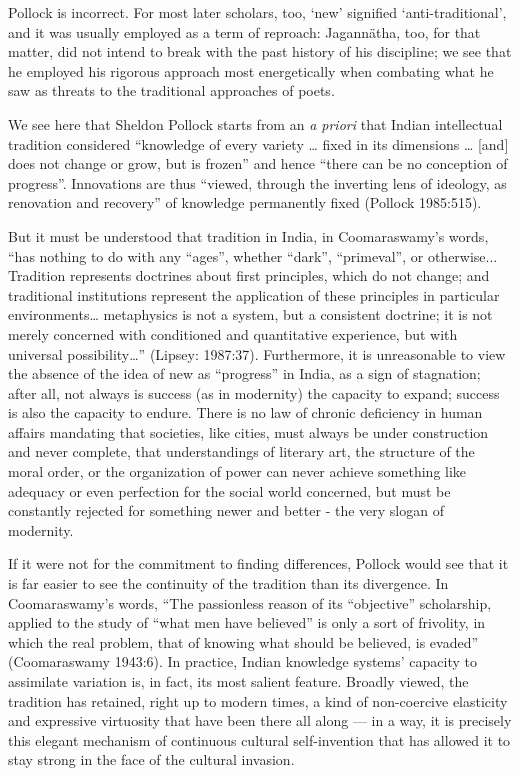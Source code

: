 Pollock is incorrect. For most later scholars, too, ‘new’ signified ‘anti-traditional’, and it was usually employed as a term of reproach: Jagannätha, too, for that matter, did not intend to break with the past history of his discipline; we see that he employed his rigorous approach most energetically when combating what he saw as threats to the traditional approaches of poets.

We see here that Sheldon Pollock starts from an {\sl a priori} that Indian intellectual tradition considered “knowledge of every variety … fixed in its dimensions … [and] does not change or grow, but is frozen” and hence “there can be no conception of progress”. Innovations are thus “viewed, through the inverting lens of ideology, as renovation and recovery” of knowledge permanently fixed (Pollock 1985:515).  

But it must be understood that tradition in India, in Coomaraswamy’s words, “has nothing to do with any “ages”, whether “dark”, “primeval”, or otherwise... Tradition represents doctrines about first principles, which do not change; and traditional institutions represent the application of these principles in particular environments… metaphysics is not a system, but a consistent doctrine; it is not merely concerned with conditioned and quantitative experience, but with universal possibility…” (Lipsey: 1987:37). Furthermore, it is unreasonable to view the absence of the idea of new as “progress” in India, as a sign of stagnation; after all, not always is success (as in modernity) the capacity to expand; success is also the capacity to endure. There is no law of chronic deficiency in human affairs mandating that societies, like cities, must always be under construction and never complete, that understandings of literary art, the structure of the moral order, or the organization of power can never achieve something like adequacy or even perfection for the social world concerned, but must be constantly rejected for something newer and better - the very slogan of modernity.  

If it were not for the commitment to finding differences, Pollock would see that it is far easier to see the continuity of the tradition than its divergence. In Coomaraswamy’s words, “The passionless reason of its “objective” scholarship, applied to the study of “what men have believed” is only a sort of frivolity, in which the real problem, that of knowing what should be believed, is evaded” (Coomaraswamy 1943:6). In practice, Indian knowledge systems’ capacity to assimilate variation is, in fact, its most salient feature. Broadly viewed, the tradition has retained, right up to modern times, a kind of non-coercive elasticity and expressive virtuosity that have been there all along — in a way, it is precisely this elegant mechanism of continuous cultural self-invention that has allowed it to stay strong in the face of the cultural invasion. 

